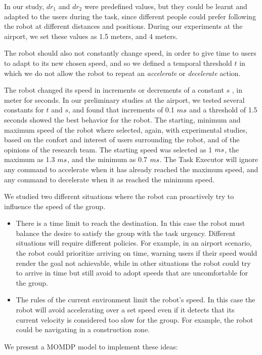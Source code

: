 In our study, $dr_1$ and $dr_2$ were predefined values, but they could be learnt and adapted to the users during the task, since different people could prefer following the robot at different distances and positions. During our experiments at the airport, we set these values as 1.5 meters, and 4 meters.

The robot should also not constantly change speed, in order to give time to users to adapt to its new chosen speed, and so we defined a temporal threshold $t$ in which we do not allow the robot to repeat an \textit{accelerate} or \textit{decelerate} action.

The robot changed its speed in increments or decrements of a constant $s$ , in meter for seconds. In our preliminary studies at the airport, we tested several constants for $t$ and $s$, and found that increments of 0.1 $m\/s$ and a threshold of 1.5 seconds showed the best behavior for the robot. The starting, minimum and maximum speed of the robot where selected, again, with experimental studies, based on the confort and interest of users surrounding the robot, and of the opinions of the research team. The starting speed was selected as 1 $m\/s$, the maximum as 1.3 $m\/s$, and the minimum as 0.7 $m\/s$. The Task Executor will ignore any command to accelerate when it has already reached the maximum speed, and any command to decelerate when it as reached the minimum speed.
  
We studied two different situations where the robot can proactively try to influence the speed of the group.
\begin{itemize}
\item There is a time limit to reach the destination. In this case the robot must balance the desire to satisfy the group with the task urgency. Different situations will require different policies. For example, in an airport scenario, the robot could prioritize arriving on time, warning users if their speed would render the goal not achievable, while in other situations the robot could try to arrive in time but still avoid to adopt speeds that are uncomfortable for the group.
\item The rules of the current environment limit the robot's speed. In this case the robot will avoid accelerating over a set speed even if it detects that its current velocity is considered too slow for the group. For example, the robot could be navigating in a construction zone.
\end{itemize}

We present a MOMDP model to implement these ideas:

